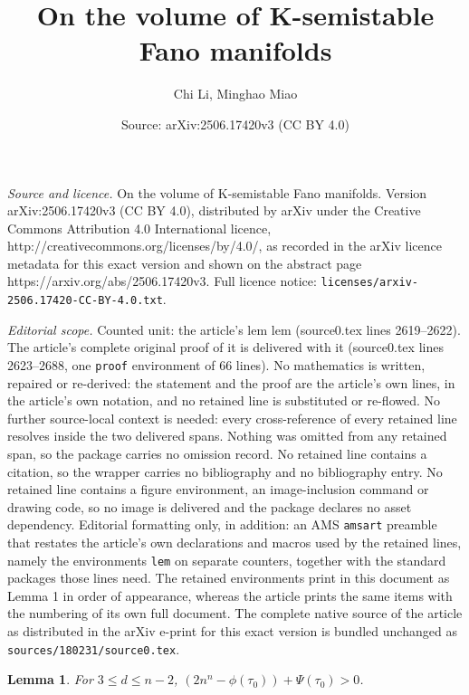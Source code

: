\documentclass[10pt,a4paper]{amsart}
\title{On the volume of K-semistable Fano manifolds}
\author{Chi Li, Minghao Miao}
\date{Source: arXiv:2506.17420v3 (CC BY 4.0)}
\newtheorem{lem}{Lemma}
\begin{document}
\maketitle

\noindent\emph{Source and licence.} On the volume of K-semistable Fano manifolds. Version arXiv:2506.17420v3 (CC BY 4.0), distributed by arXiv under the Creative Commons Attribution 4.0 International licence, http://creativecommons.org/licenses/by/4.0/, as recorded in the arXiv licence metadata for this exact version and shown on the abstract page https://arxiv.org/abs/2506.17420v3. Full licence notice: \texttt{licenses/arxiv-2506.17420-CC-BY-4.0.txt}.\par\smallskip

\noindent\textit{Editorial scope.} Counted unit: the article's lem lem (source0.tex lines 2619--2622). The article's complete original proof of it is delivered with it (source0.tex lines 2623--2688, one \texttt{proof} environment of 66 lines). No mathematics is written, repaired or re-derived: the statement and the proof are the article's own lines, in the article's own notation, and no retained line is substituted or re-flowed.  No further source-local context is needed: every cross-reference of every retained line resolves inside the two delivered spans.  Nothing was omitted from any retained span, so the package carries no omission record.  No retained line contains a citation, so the wrapper carries no bibliography and no bibliography entry.  No retained line contains a figure environment, an image-inclusion command or drawing code, so no image is delivered and the package declares no asset dependency.  Editorial formatting only, in addition: an AMS \texttt{amsart} preamble that restates the article's own declarations and macros used by the retained lines, namely the environments \texttt{lem} on separate counters, together with the standard packages those lines need.  The retained environments print in this document as Lemma 1 in order of appearance, whereas the article prints the same items with the numbering of its own full document.  The complete native source of the article as distributed in the arXiv e-print for this exact version is bundled unchanged as \texttt{sources/180231/source0.tex}.
\begin{lem}
For $3\le d\le n-2$, 
    $(2n^n-\phi(\tau_0))+\Psi(\tau_0)>0$. 
\end{lem}
\end{document}
